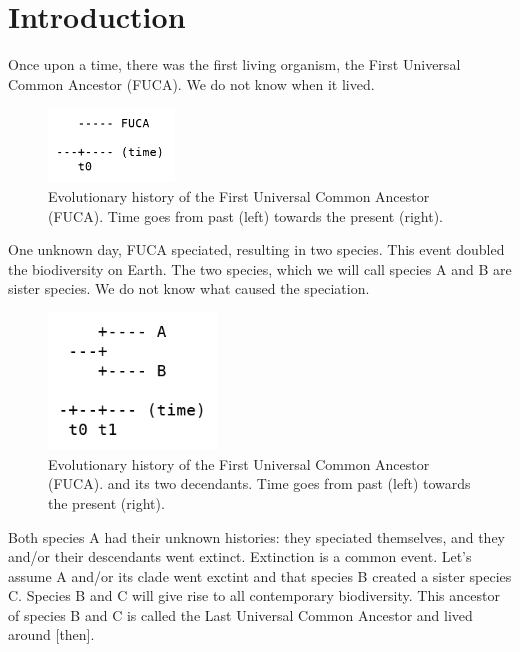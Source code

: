 \chapter{Introduction}
\label{chapter_introduction}
\newpage

\noindent

Once upon a time, there was the first living organism, the 
First Universal Common Ancestor (FUCA).
We do not know when it lived.

\begin{figure}[H]
  \includegraphics[width=0.3\textwidth]{t_0.png}
  \caption{
    Evolutionary history of the First Universal Common Ancestor (FUCA).
    Time goes from past (left) towards the present (right).
  }
  \label{fig:t_0}
\end{figure}

One unknown day, FUCA speciated, resulting in two species.
This event doubled the biodiversity on Earth.
The two species, which we will call species A and B
are sister species.
We do not know what caused the speciation.

\begin{figure}[H]
  \includegraphics[width=0.4\textwidth]{t_1.png}
  \caption{
    Evolutionary history of the First Universal Common Ancestor (FUCA).
    and its two decendants.
    Time goes from past (left) towards the present (right).
  }
  \label{fig:t_1}
\end{figure}

Both species A had their unknown histories: they speciated themselves,
and they and/or their descendants went extinct. 
Extinction is a common event. Let's assume A and/or its clade went
exctint and that species B created a sister species C. Species B
and C will give rise to all contemporary biodiversity. This ancestor of species B and C 
is called the Last Universal Common Ancestor and lived around [then].

